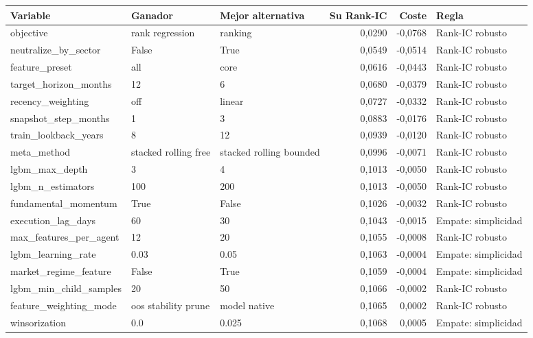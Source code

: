 \begin{tabular}{lllrrl}
\toprule
Variable & Ganador & Mejor alternativa & Su Rank-IC & Coste & Regla \\
\midrule
objective & rank regression & ranking & 0,0290 & -0,0768 & Rank-IC robusto \\
neutralize\_by\_sector & False & True & 0,0549 & -0,0514 & Rank-IC robusto \\
feature\_preset & all & core & 0,0616 & -0,0443 & Rank-IC robusto \\
target\_horizon\_months & 12 & 6 & 0,0680 & -0,0379 & Rank-IC robusto \\
recency\_weighting & off & linear & 0,0727 & -0,0332 & Rank-IC robusto \\
snapshot\_step\_months & 1 & 3 & 0,0883 & -0,0176 & Rank-IC robusto \\
train\_lookback\_years & 8 & 12 & 0,0939 & -0,0120 & Rank-IC robusto \\
meta\_method & stacked rolling free & stacked rolling bounded & 0,0996 & -0,0071 & Rank-IC robusto \\
lgbm\_max\_depth & 3 & 4 & 0,1013 & -0,0050 & Rank-IC robusto \\
lgbm\_n\_estimators & 100 & 200 & 0,1013 & -0,0050 & Rank-IC robusto \\
fundamental\_momentum & True & False & 0,1026 & -0,0032 & Rank-IC robusto \\
execution\_lag\_days & 60 & 30 & 0,1043 & -0,0015 & Empate: simplicidad \\
max\_features\_per\_agent & 12 & 20 & 0,1055 & -0,0008 & Rank-IC robusto \\
lgbm\_learning\_rate & 0.03 & 0.05 & 0,1063 & -0,0004 & Empate: simplicidad \\
market\_regime\_feature & False & True & 0,1059 & -0,0004 & Empate: simplicidad \\
lgbm\_min\_child\_samples & 20 & 50 & 0,1066 & -0,0002 & Rank-IC robusto \\
feature\_weighting\_mode & oos stability prune & model native & 0,1065 & 0,0002 & Rank-IC robusto \\
winsorization & 0.0 & 0.025 & 0,1068 & 0,0005 & Empate: simplicidad \\
\bottomrule
\end{tabular}
